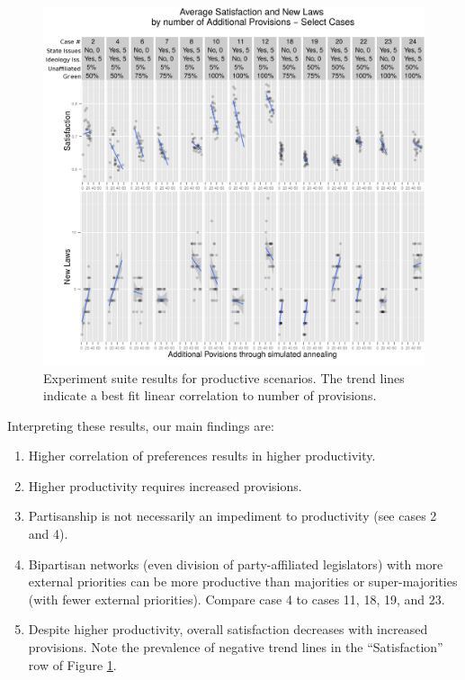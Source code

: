 \documentclass[pdftex,12pt,oribibl]{llncs}
\begin{document}
\begin{figure}[h!]
\centering
\includegraphics[width=4.75in]{combinedResults.png}
\caption[ ]{Experiment suite results for productive scenarios.  The trend lines indicate a best fit linear correlation to number of provisions.} 
\label{combined}
\end{figure}

Interpreting these results, our main findings are:
\begin{enumerate}
\item Higher correlation of preferences results in higher productivity.
\item Higher productivity requires increased provisions.
\item Partisanship is not necessarily an impediment to productivity (see cases 2 and 4).
\item Bipartisan networks (even division of party-affiliated legislators) with more external priorities can be more productive than majorities or super-majorities (with fewer external priorities).  Compare case 4 to cases 11, 18, 19, and 23.
\item Despite higher productivity, overall satisfaction decreases with increased provisions.  Note the prevalence of negative trend lines in the ``Satisfaction'' row of Figure \ref{combined}.
\end{enumerate}
\end{document}
